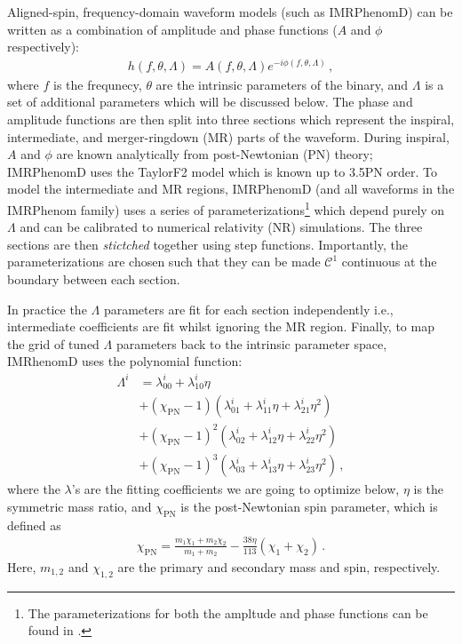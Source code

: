 \documentclass[twocolumn]{aastex631}
\begin{document}
Aligned-spin, frequency-domain waveform models (such as IMRPhenomD) can be written as a
combination of amplitude and phase functions ($A$ and $\phi$ respectively):
\begin{align}\label{eq:}
	h(f,\theta,\Lambda) = A(f,\theta,\Lambda)e^{-i\phi(f,\theta,\Lambda)}\,,
\end{align}
where $f$ is the frequnecy, $\theta$ are the intrinsic parameters of the binary, and $\Lambda$ is a set of additional
parameters which will be discussed below. 
The phase and amplitude functions are then split into three sections which represent the
inspiral, intermediate, and merger-ringdown (MR) parts of the waveform. 
During inspiral, $A$ and $\phi$ are known analytically from post-Newtonian (PN) theory;
IMRPhenomD uses the TaylorF2 model \citep{Buonanno:2009zt, Arun:2004hn} which is known up to 3.5PN order.
To model the intermediate and MR regions, IMRPhenomD (and all waveforms in the IMRPhenom family)
uses a series of parameterizations\footnote{
	The parameterizations for both the ampltude and phase functions can be found in \citep{khan2016frequency}.
} 
which depend purely on $\Lambda$ and can be calibrated to numerical relativity (NR) simulations.
The three sections are then \textit{stictched} together using step functions.
Importantly, the parameterizations are chosen such that they can be made $\mathcal{C}^1$ continuous at the
boundary between each section.

In practice the $\Lambda$ parameters are fit for each section independently i.e., intermediate coefficients are fit whilst ignoring the MR region.
Finally, to map the grid of tuned $\Lambda$ parameters back to the intrinsic parameter space, IMRhenomD uses the polynomial function:
\begin{align} \label{eq:Lambda}
	\Lambda^i&=\lambda_{00}^i+\lambda_{10}^i\eta \nonumber \\
	&+(\chi_{\mathrm{PN}}-1)(\lambda_{01}^i+\lambda_{11}^i\eta+\lambda_{21}^i\eta^2) \nonumber \\ 
	&+(\chi_{\mathrm{PN}}-1)^2(\lambda_{02}^i+\lambda_{12}^i\eta+\lambda_{22}^i\eta^2) \nonumber \\
	&+(\chi_{\mathrm{PN}}-1)^3(\lambda_{03}^i+\lambda_{13}^i\eta+\lambda_{23}^i\eta^2)\,,
\end{align}
where the $\lambda$'s are the fitting coefficients we are going to optimize below, $\eta$ is
the symmetric mass ratio, and $\chi_{\mathrm{PN}}$ is the post-Newtonian spin
parameter, which is defined as 
\begin{align}
	\chi_{\mathrm{PN}}=\frac{m_1\chi_1+m_2\chi_2}{m_1+m_2}-\frac{38\eta}{113}(\chi_1+\chi_2)\,.
\end{align}
Here, $m_{1,2}$ and $\chi_{1,2}$ are the primary and secondary mass and spin,
respectively. 
\end{document}
